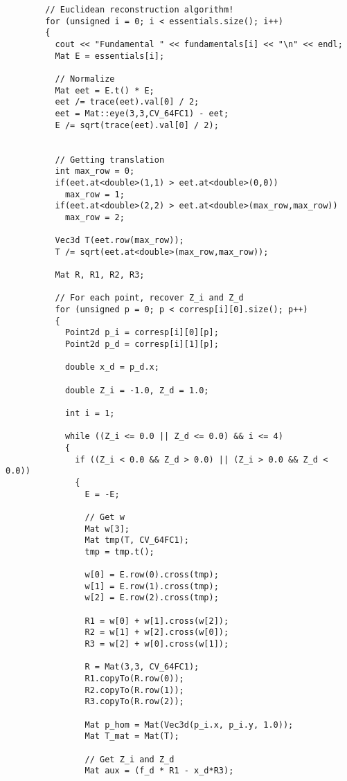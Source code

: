 \documentclass[a4paper, 11pt]{article}
\theoremstyle{definition}
\begin{document}
      \begin{lstlisting}
        // Euclidean reconstruction algorithm!
        for (unsigned i = 0; i < essentials.size(); i++)
        {
          cout << "Fundamental " << fundamentals[i] << "\n" << endl;
          Mat E = essentials[i];

          // Normalize
          Mat eet = E.t() * E;
          eet /= trace(eet).val[0] / 2;
          eet = Mat::eye(3,3,CV_64FC1) - eet;
          E /= sqrt(trace(eet).val[0] / 2);


          // Getting translation
          int max_row = 0;
          if(eet.at<double>(1,1) > eet.at<double>(0,0))
            max_row = 1;
          if(eet.at<double>(2,2) > eet.at<double>(max_row,max_row))
            max_row = 2;

          Vec3d T(eet.row(max_row));
          T /= sqrt(eet.at<double>(max_row,max_row));

          Mat R, R1, R2, R3;

          // For each point, recover Z_i and Z_d
          for (unsigned p = 0; p < corresp[i][0].size(); p++)
          {
            Point2d p_i = corresp[i][0][p];
            Point2d p_d = corresp[i][1][p];

            double x_d = p_d.x;

            double Z_i = -1.0, Z_d = 1.0;

            int i = 1;

            while ((Z_i <= 0.0 || Z_d <= 0.0) && i <= 4)
            {
              if ((Z_i < 0.0 && Z_d > 0.0) || (Z_i > 0.0 && Z_d < 0.0))
              {
                E = -E;

                // Get w
                Mat w[3];
                Mat tmp(T, CV_64FC1);
                tmp = tmp.t();

                w[0] = E.row(0).cross(tmp);
                w[1] = E.row(1).cross(tmp);
                w[2] = E.row(2).cross(tmp);

                R1 = w[0] + w[1].cross(w[2]);
                R2 = w[1] + w[2].cross(w[0]);
                R3 = w[2] + w[0].cross(w[1]);

                R = Mat(3,3, CV_64FC1);
                R1.copyTo(R.row(0));
                R2.copyTo(R.row(1));
                R3.copyTo(R.row(2));

                Mat p_hom = Mat(Vec3d(p_i.x, p_i.y, 1.0));
                Mat T_mat = Mat(T);

                // Get Z_i and Z_d
                Mat aux = (f_d * R1 - x_d*R3);


\end{lstlisting}
\end{document}
